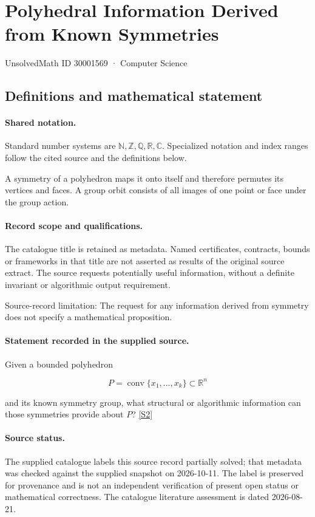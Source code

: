 \documentclass[11pt]{article}
\newcommand{\sref}[2]{\hyperlink{source:#1:#2}{[S#2]}}
\begin{document}
\setcounter{section}{30001568}
\section{Polyhedral Information Derived from Known Symmetries}\label{30001569}
{\small\sffamily UnsolvedMath ID 30001569 · Computer Science}
\subsection{Definitions and mathematical statement}

\paragraph{Shared notation.}Standard number systems are $\mathbb N,\mathbb Z,\mathbb Q,\mathbb R,\mathbb C$. Specialized notation and index ranges follow the cited source and the definitions below.


A symmetry of a polyhedron maps it onto itself and therefore permutes its vertices and faces. A group orbit consists of all images of one point or face under the group action.
\paragraph{Record scope and qualifications.}
The catalogue title is retained as metadata. Named certificates, contracts, bounds or frameworks in that title are not asserted as results of the original source extract.
The source requests potentially useful information, without a definite invariant or algorithmic output requirement.

Source-record limitation: The request for any information derived from symmetry does not specify a mathematical proposition.
\paragraph{Statement recorded in the supplied source.}
Given a bounded polyhedron

$$P=\operatorname{conv}\{x_1,\ldots,x_k\}\subset\mathbb R^n$$

and its known symmetry group, what structural or algorithmic information can those symmetries provide about $P$? \sref{30001569}{2}
\paragraph{Source status.}
The supplied catalogue labels this source record partially solved; that metadata was checked against the supplied snapshot on 2026-10-11. The label is preserved for provenance and is not an independent verification of present open status or mathematical correctness. The catalogue literature assessment is dated 2026-08-21.
\end{document}
